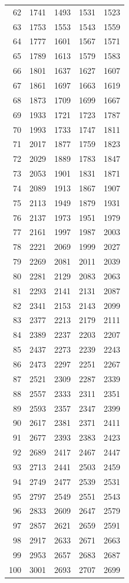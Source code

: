\documentclass[11pt,a4paper,reqno]{amsart}
\theoremstyle{definition}
\theoremstyle{remark}
\begin{document}
\begin{longtable}{r r r r r}
62 & 1741 & 1493 & 1531 & 1523 \\
63 & 1753 & 1553 & 1543 & 1559 \\
64 & 1777 & 1601 & 1567 & 1571 \\
65 & 1789 & 1613 & 1579 & 1583 \\
66 & 1801 & 1637 & 1627 & 1607 \\
67 & 1861 & 1697 & 1663 & 1619 \\
68 & 1873 & 1709 & 1699 & 1667 \\
69 & 1933 & 1721 & 1723 & 1787 \\
70 & 1993 & 1733 & 1747 & 1811 \\
71 & 2017 & 1877 & 1759 & 1823 \\
72 & 2029 & 1889 & 1783 & 1847 \\
73 & 2053 & 1901 & 1831 & 1871 \\
74 & 2089 & 1913 & 1867 & 1907 \\
75 & 2113 & 1949 & 1879 & 1931 \\
76 & 2137 & 1973 & 1951 & 1979 \\
77 & 2161 & 1997 & 1987 & 2003 \\
78 & 2221 & 2069 & 1999 & 2027 \\
79 & 2269 & 2081 & 2011 & 2039 \\
80 & 2281 & 2129 & 2083 & 2063 \\
81 & 2293 & 2141 & 2131 & 2087 \\
82 & 2341 & 2153 & 2143 & 2099 \\
83 & 2377 & 2213 & 2179 & 2111 \\
84 & 2389 & 2237 & 2203 & 2207 \\
85 & 2437 & 2273 & 2239 & 2243 \\
86 & 2473 & 2297 & 2251 & 2267 \\
87 & 2521 & 2309 & 2287 & 2339 \\
88 & 2557 & 2333 & 2311 & 2351 \\
89 & 2593 & 2357 & 2347 & 2399 \\
90 & 2617 & 2381 & 2371 & 2411 \\
91 & 2677 & 2393 & 2383 & 2423 \\
92 & 2689 & 2417 & 2467 & 2447 \\
93 & 2713 & 2441 & 2503 & 2459 \\
94 & 2749 & 2477 & 2539 & 2531 \\
95 & 2797 & 2549 & 2551 & 2543 \\
96 & 2833 & 2609 & 2647 & 2579 \\
97 & 2857 & 2621 & 2659 & 2591 \\
98 & 2917 & 2633 & 2671 & 2663 \\
99 & 2953 & 2657 & 2683 & 2687 \\
100 & 3001 & 2693 & 2707 & 2699 \\
\end{longtable}
\endgroup
\end{document}
